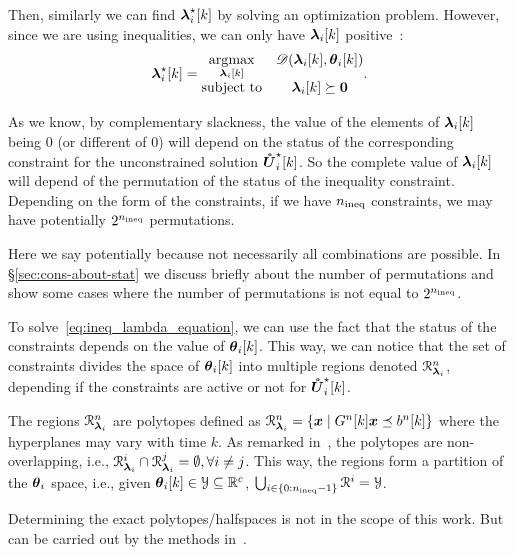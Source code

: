 \documentclass[../main.tex]{subfiles}
\begin{document}
Then, similarly we can find $\lambdaikstar$ by solving an optimization problem.
However, since we are using inequalities, we can only have $\lambdaik$ positive~\cite{BoydVandenberghe2004}:
\begin{equation}
  \label{eq:ineq_lambda_equation}
  \begin{matrix}
    \lambdaikstar=
    \begin{matrix}
      \argmax\limits_{\lambdaik}&\dualfunction\\
      \mathrm{subject~ to}& \lambdaik\succeq\0
    \end{matrix}.
  \end{matrix}
\end{equation}

As we know, by complementary slackness, the value of the elements of $\lambdaik$ being $0$ (or different of $0$) will depend on the status of the corresponding constraint for the unconstrained solution $\optuncUik$.
So the complete value of $\lambdaik$ will depend of the permutation of the status of the inequality constraint.
Depending on the form of the constraints, if we have $n_{\text{ineq}}$ constraints, we may have potentially $2^{n_{\text{ineq}}}$ permutations.
\begin{remark}
  Here we say potentially because not necessarily all combinations are possible.
  In \S\ref{sec:cons-about-stat} we discuss briefly about the number of permutations and show some cases where the number of permutations is not equal to $2^{n_{\text{ineq}}}$.
\end{remark}

To solve~\eqref{eq:ineq_lambda_equation}, we can use the fact that the status of the constraints depends on the value of $\thetaik$.
This way, we can notice that the set of constraints divides the space of $\thetaik$ into multiple regions denoted $\mathcal{R}_{\boldsymbol{\lambda}_{i}}^{n}$, depending if the constraints are active or not for $\optuncUik$.

The regions $\mathcal{R}_{\boldsymbol{\lambda}_{i}}^{n}$ are polytopes defined as ${\mathcal{R}_{\boldsymbol{\lambda}_{i}}^{n}=\{\boldsymbol{x}\mid G^{n}[k]\boldsymbol{x} \preceq b^{n}[k]\}}$ where the hyperplanes may vary with time $k$.
As remarked in~\cite{BemporadEtAl2002}, the polytopes are non-overlapping, i.e., ${\mathcal{R}_{\boldsymbol{\lambda}_{i}}^{i}\cap\mathcal{R}_{\boldsymbol{\lambda}_{i}}^{j}=\emptyset, \forall i\neq j}$.
This way, the regions form a partition of the $\boldsymbol{\theta}_{i}$ space, i.e., given $\thetaik\in\set{Y}\subseteq\R^{c}$, ${\bigcup_{i\in\{0:n_{\text{ineq}}-1\}}\mathcal{R}^{i}=\mathcal{Y}}$.
\begin{remark}
  Determining the exact polytopes/halfspaces is not in the scope of this work.
  But can be carried out by the methods in~\cite[\S4.1.3.2]{LauerBloch2019}.
\end{remark}
\end{document}
